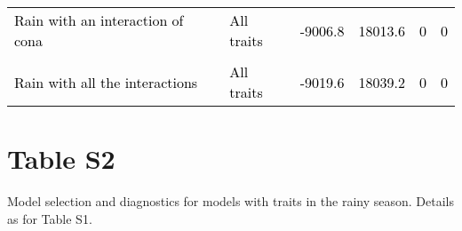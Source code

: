 \documentclass[
  12pt,
  letterpaper,
  DIV=11,
  numbers=noendperiod]{scrartcl}
\begin{document}
\begin{table}[H]
{\begin{tabular}[t]{llllll}
\textcolor{black}{Rain with an interaction of cona} & \textcolor{black}{All traits} & \textcolor{black}{-9006.8} & \textcolor{black}{18013.6} & \textcolor{black}{0} & \textcolor{black}{0}\\
\addlinespace
\cellcolor{gray!6}{\textcolor{black}{Rain with an interaction of cons and cona}} & \cellcolor{gray!6}{\textcolor{black}{All traits}} & \cellcolor{gray!6}{\textcolor{black}{-9007.0}} & \cellcolor{gray!6}{\textcolor{black}{18014.0}} & \cellcolor{gray!6}{\textcolor{black}{0}} & \cellcolor{gray!6}{\textcolor{black}{0}}\\
\textcolor{black}{Rain with all the interactions} & \textcolor{black}{All traits} & \textcolor{black}{-9019.6} & \textcolor{black}{18039.2} & \textcolor{black}{0} & \textcolor{black}{0}\\
\bottomrule
\end{tabular}}
\end{table}

\newpage

\hypertarget{table-s2}{%
\section{Table S2}\label{table-s2}}

Model selection and diagnostics for models with traits in the rainy
season. Details as for Table S1.
\end{document}
